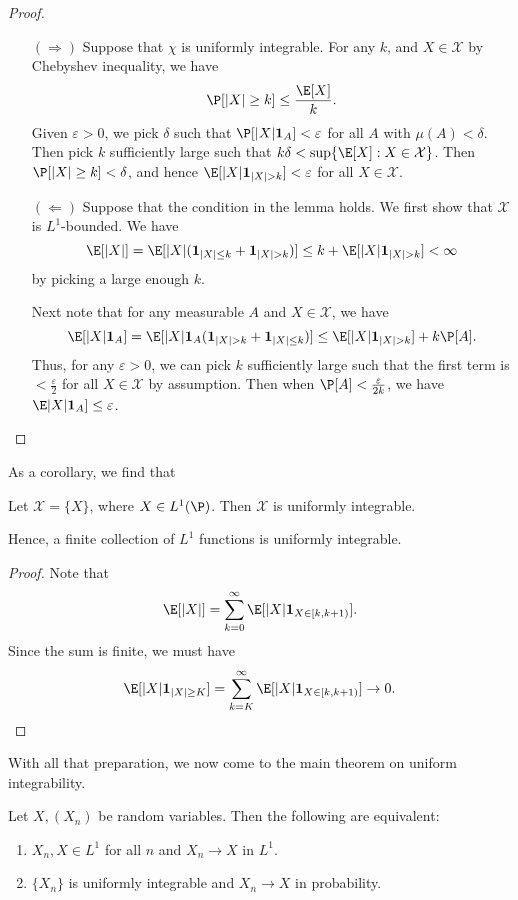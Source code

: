 \documentclass[a4paper]{article}
\begin{document}
\begin{proof}\leavevmode
  \begin{itemize}
    \item[$(\Rightarrow)$] Suppose that $\chi$ is uniformly integrable. For any $k$, and $X \in \mathcal{X}$ by Chebyshev inequality, we have
      \[
        \P[|X| \geq k] \leq \frac{\E[X]}{k}.
      \]
      Given $\varepsilon > 0$, we pick $\delta$ such that $\P[|X| \mathbf{1}_A] < \varepsilon$ for all $A$ with $\mu(A) < \delta$. Then pick $k$ sufficiently large such that $k \delta < \sup\{\E[X]: X \in \mathcal{X}\}$. Then $\P[|X| \geq k] < \delta$, and hence $\E[|X|\mathbf{1}_{|X| > k}] < \varepsilon$ for all $X \in \mathcal{X}$.
    \item[$(\Leftarrow)$] Suppose that the condition in the lemma holds. We first show that $\mathcal{X}$ is $L^1$-bounded. We have
      \[
        \E[|X|] = \E[|X|(\mathbf{1}_{|X| \leq k} + \mathbf{1}_{|X| > k})] \leq k + \E[|X| \mathbf{1}_{|X| > k}] < \infty
      \]
      by picking a large enough $k$.

      Next note that for any measurable $A$ and $X \in \mathcal{X}$, we have
      \[
        \E[|X| \mathbf{1}_A] = \E[|X| \mathbf{1}_A(\mathbf{1}_{|X| > k} + \mathbf{1}_{|X| \leq k})] \leq \E[|X| \mathbf{1}_{|X| > k}] + k \P[A].
      \]
      Thus, for any $\varepsilon > 0$, we can pick $k$ sufficiently large such that the first term is $< \frac{\varepsilon}{2}$ for all $X \in \mathcal{X}$ by assumption. Then when $\P[A] < \frac{\varepsilon}{2k}$, we have $\E|X| \mathbf{1}_A] \leq \varepsilon$.\qedhere
  \end{itemize}
\end{proof}

As a corollary, we find that
\begin{cor}
  Let $\mathcal{X} = \{X\}$, where $X \in L^1(\P)$. Then $\mathcal{X}$ is uniformly integrable.

  Hence, a finite collection of $L^1$ functions is uniformly integrable.
\end{cor}

\begin{proof}
  Note that
  \[
    \E[|X|] = \sum_{k = 0}^\infty \E[|X| \mathbf{1}_{X \in [k, k + 1)}].
  \]
  Since the sum is finite, we must have
  \[
    \E[|X|\mathbf{1}_{|X| \geq K}] = \sum_{k = K}^\infty \E[|X| \mathbf{1}_{X \in [k, k + 1)}] \to 0.\qedhere
  \]
\end{proof}

With all that preparation, we now come to the main theorem on uniform integrability.
\begin{thm}
  Let $X, (X_n)$ be random variables. Then the following are equivalent:
  \begin{enumerate}
    \item $X_n, X \in L^1$ for all $n$ and $X_n \to X$ in $L^1$.
    \item $\{X_n\}$ is uniformly integrable and $X_n \to X$ in probability.
  \end{enumerate}
\end{thm}
\end{document}
